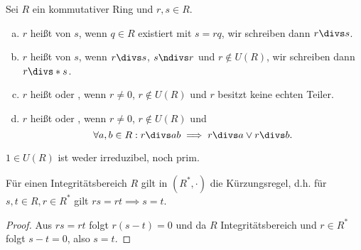 \begin{df} \label{1.3}
	Sei $R$ ein kommutativer Ring und $r, s \in R$.
	\begin{enumerate}[a)]
		\item
			$r$ heißt  von $s$, wenn $q \in R$ existiert mit $s = r q$, wir schreiben dann $r \divs  s$.
		\item
			$r$ heißt  von $s$, wenn $r\divs s$, $s \ndivs  r$ und $r \not\in U(R)$, wir schreiben dann $r \divs*  s$.
		\item
			$r$ heißt  oder , wenn $r \neq 0$, $r \not\in U(R)$ und $r$ besitzt keine echten Teiler.
		\item
			$r$ heißt  oder , wenn $r \neq 0$, $r \not\in U(R)$ und
			\[
				\forall a,b \in R : r \divs  ab \implies r \divs  a \lor r \divs  b.
			\]
	\end{enumerate}
	\begin{note}
		$1 \in U(R)$ ist weder irreduzibel, noch prim.
	\end{note}
\end{df}

\begin{lem} \label{1.4}
	Für einen Integritätsbereich $R$ gilt in $(R^*, \cdot)$ die Kürzungsregel, d.h. für $s, t \in R, r \in R^*$ gilt $r s = r t \implies s = t$.
	\begin{proof}
		Aus $r s = r t$ folgt $r(s-t) = 0$ und da $R$ Integritätsbereich und $r \in R^*$ folgt $s-t = 0$, also $s = t$.
	\end{proof}
\end{lem}


